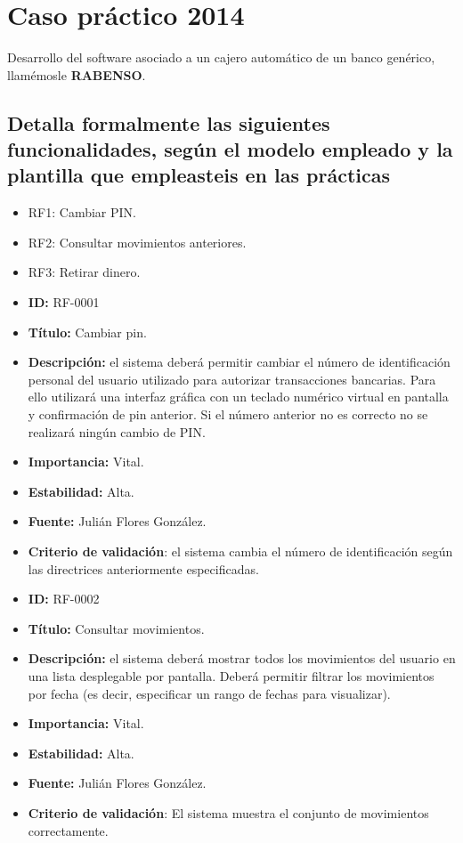 \section{Caso práctico 2014}

Desarrollo del software asociado a un cajero automático de un banco genérico, llamémosle \textbf{RABENSO}.

\subsection{Detalla formalmente las siguientes funcionalidades, según el modelo empleado y la plantilla que empleasteis en las prácticas}
\begin{itemize}
    \item RF1: Cambiar PIN.
    \item RF2: Consultar movimientos anteriores.
    \item RF3: Retirar dinero.
\end{itemize}

\begin{itemize}
    \item \textbf{ID:} RF-0001
    \item \textbf{Título:} Cambiar pin.
    \item \textbf{Descripción:} el sistema deberá permitir cambiar el número de identificación personal del usuario utilizado para autorizar transacciones bancarias. Para ello utilizará una interfaz gráfica con un teclado numérico virtual en pantalla y confirmación de pin anterior. Si el número anterior no es correcto no se realizará ningún cambio de PIN.
    \item \textbf{Importancia:} Vital.
    \item \textbf{Estabilidad:} Alta.
    \item \textbf{Fuente:} Julián Flores González.
    \item \textbf{Criterio de validación}: el sistema cambia el número de identificación según las directrices anteriormente especificadas.
\end{itemize}

\begin{itemize}
    \item \textbf{ID:} RF-0002
    \item \textbf{Título:} Consultar movimientos.
    \item \textbf{Descripción:} el sistema deberá mostrar todos los movimientos del usuario en una lista desplegable por pantalla. Deberá permitir filtrar los movimientos por fecha (es decir, especificar un rango de fechas para visualizar).
    \item \textbf{Importancia:} Vital.
    \item \textbf{Estabilidad:} Alta.
    \item \textbf{Fuente:} Julián Flores González.
    \item \textbf{Criterio de validación}: El sistema muestra el conjunto de movimientos correctamente.
\end{itemize}

